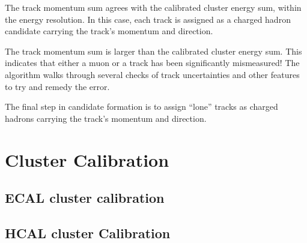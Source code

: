 The track momentum sum agrees with the calibrated cluster energy sum, within the energy resolution.  In this case, each track is assigned as a charged hadron candidate carrying the track’s momentum and direction.  

The track momentum sum is larger than the calibrated cluster energy sum. This indicates that either a muon or a track has been significantly mismeasured! The algorithm walks through several checks of track uncertainties and other features to try and remedy the error. 

The final step in candidate formation is to assign “lone” tracks as charged hadrons carrying the track’s momentum and direction. 

\section{Cluster Calibration}


\subsection{ECAL cluster calibration}




\subsection{HCAL cluster Calibration}






